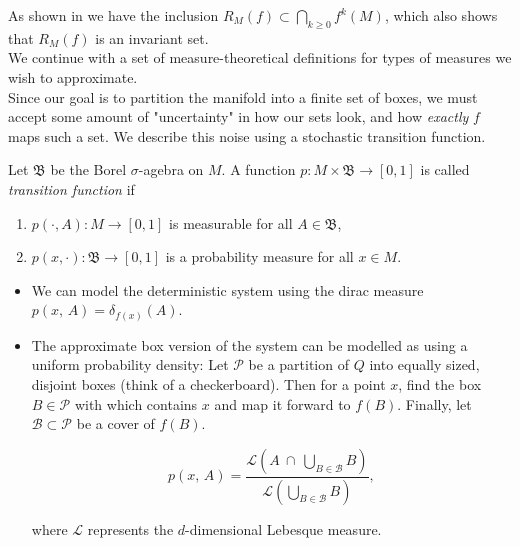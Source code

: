 As shown in \cite*{algGAIO} we have the inclusion $R_M(f) \subset \bigcap_{k \geq 0} f^k(M)$,
which also shows that $R_M(f)$ is an invariant set. \\

We continue with a set of measure-theoretical definitions for types of measures we wish to 
approximate. \\

Since our goal is to partition the manifold into a finite set of boxes, we must accept some
amount of "uncertainty" in how our sets look, and how \emph{exactly} $f$ maps such a set.
We describe this noise using a stochastic transition function. 

\begin{definition}
    \cite*{attr} Let $\mathfrak{B}$ be the Borel $\sigma$-agebra on $M$. A function 
    $p : M \times \mathfrak{B} \to [0,1]$ is called \emph{transition function} if

    \begin{enumerate}
        \item $p(\cdot, A) : M \to [0,1]$ is measurable for all $A \in \mathfrak{B}$,
        \item $p(x, \cdot) : \mathfrak{B} \to [0,1]$ is a probability measure for all $x \in M$.
    \end{enumerate}

\end{definition}

\begin{example}

    \begin{itemize}
        \item \cite*{attr} We can model the deterministic system using the dirac measure \\
        $p(x,\, A) = \delta_{f(x)}(A)$. 
        \item The approximate box version of the system can be modelled as using a uniform 
        probability density: Let $\mathcal{P}$ be a partition of $Q$ into equally sized,
        disjoint boxes (think of a checkerboard). Then for a point $x$, find the box 
        $B \in \mathcal{P}$ with which contains $x$ and map it forward to $f(B)$. Finally, let 
        $\mathcal{B} \subset \mathcal{P}$ be a cover of $f(B)$.

        \begin{equation}
            p(x,\, A) = \frac{
                \mathcal{L} \left( A\ \cap\ \bigcup_{B \in \mathcal{B}} B \right)
            }{
                \mathcal{L} \left(\bigcup_{B \in \mathcal{B}} B \right)
            },
        \end{equation}

        where $\mathcal{L}$ represents the $d$-dimensional Lebesque measure.
    
    \end{itemize}

\end{example}

